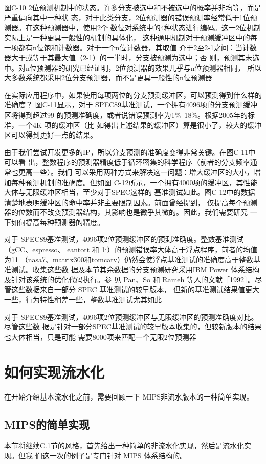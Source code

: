 图C-10 2位预测机制中的状态。许多分支被选中和不被选中的概率并非均等，而是严重偏向其中一种状
态，对于此类分支，2位预测器的错误预测率经常低于1位预测器。在这种预测器中，使用2个
数位对系统中的4种状态进行编码。这一2位机制实际上是一种更具一般性的机制的具体化，
这种通用机制对于预测缓冲区中的每一项都有n位饱和计数器。对于一个n位计数器，其取值
介于2至2-1之间：当计数器大于或等于其最大值（2-1）的一半时，分支被预测为选中；否
则，预测其未选中。对n位预测器的研究已经证明，2位预测器的效果几乎与n位预测器相同，
所以大多数系统都采用2位分支预测器，而不是更具一般性的n位预测器

在实际应用程序中，如果使用每项两位的分支预测缓冲区，可以预测得到什么样的准确度？
图C-11显示，对于 SPEC89基准测试，一个拥有4096项的分支预测缓冲区将得到超过99%
的预测准确度，或者说错误预测率为1\%~18\%。根据2005年的标准，一个4K 项的缓冲区（比
如得出上述结果的缓冲区）算是很小了，较大的缓冲区可以得到更好一点的结果。

由于我们尝试开发更多的IP，所以分支预测的准确度变得非常关键。在图C-11中可以看
出，整数程序的预测器精度低于循环密集的科学程序（前者的分支频率通常也更高一些）。我们
可以采用两种方式来解决这一问题：增大缓冲区的大小，增加每种预测机制的准确度。但如图
C-12所示，一个拥有4000项的缓冲区，其性能大体与无限缓冲区相当，至少对于SPEC这样的
基准测试如此。图C-12中的数据清楚地表明缓冲区的命中率并非主要限制因素。前面曾经提到，
仅提高每个预测器的位数而不改变预测器结构，其影响也是微乎其微的。因此，我们需要研究
一下如何提高每种预测器的精度。

对于 SPEC89基准测试，4096项2位预测缓冲区的预測准确度。整数基准测试（gCC、espresso、
eantott 和 1i）的预测错误率大体高于浮点程序，前者的均值为11%
（nasa7、matrix300和tomcatv）仍然会使浮点基准测试的准确度高于整数基准测试。收集这些数
据及本节其余数据的分支预测研究采用IBM Power 体系结构及针对该系统的优化代码执行。参
见 Pan、So 和 Rameh 等人的文献［1992］。尽管这些数据来自一部分 SPEC 基准测试的较早版本，
但新的基准测试结果值更大一些，行为特性稍差一些，整数基准测试尤其如此

对于 SPEC89基准测试，4096项2位预测缓冲区与无限缓冲区的预测准确度对比。尽管这些数
据是针对一部分SPEC基准测试的较早版本收集的，但较新版本的结果也大体相当，只是可能
需要8000项来匹配一个无限2位预测器

\section{如何实现流水化}
在开始介绍基本流水化之前，需要回顾一下 MIPS非流水版本的一种简单实现。

\subsection{MIPS的简单实现}
本节将继续C.1节的风格，首先给出一种简单的非流水化实现，然后是流水化实现。但我
们这一次的例子是专门针对 MIPS 体系结构的。

